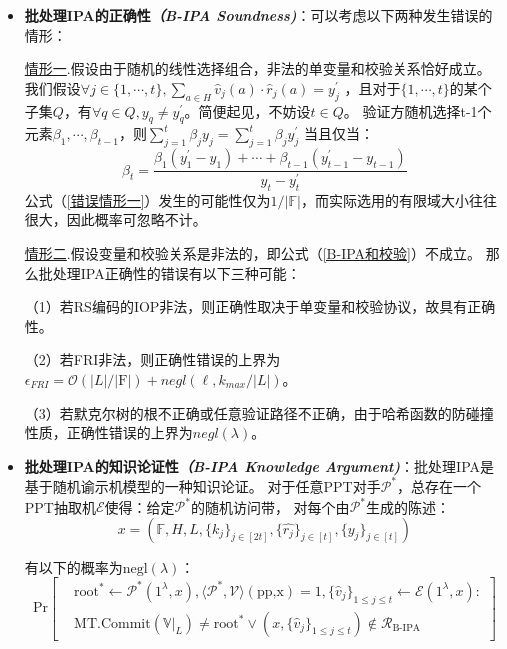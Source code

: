 \documentclass[zihao=-4]{ctexart}
\begin{document}
\begin{spacing}{1.5}
\begin{itemize}
  \item \textbf{批处理IPA的正确性\emph{（B-IPA Soundness)}}：可以考虑以下两种发生错误的情形：\par
        \underline{情形一}.假设由于随机的线性选择组合，非法的单变量和校验关系恰好成立。
        我们假设$\forall j \in\{1,\cdots,t\},\sum_{a\in H}\hat{v}_j(a)\cdot\hat{r}_j(a)=y_j^{\prime}$
        ，且对于$\{1,\cdots,t\}$的某个子集$Q$，有$\forall q \in Q,y_q\neq y_q^{\prime}$。简便起见，不妨设$t\in Q$。
        验证方随机选择t-1个元素$\beta_1,\cdots,\beta_{t-1}$，则$\sum_{j=1}^t\beta_jy_j=\sum_{j=1}^t\beta_jy_j^{\prime}$
        当且仅当：
        \begin{equation}\beta_t=\dfrac{\beta_1(y_1^{\prime}-y_1)+\cdots+\beta_{t-1}(y_{t-1}^{\prime}-y_{t-1})}{y_t-y_t^{\prime}} \label{错误情形一}\end{equation}
        公式（\ref{错误情形一}）发生的可能性仅为$1/|\mathbb{F}|$，而实际选用的有限域大小往往很大，因此概率可忽略不计。\par
        \underline{情形二}.假设变量和校验关系是非法的，即公式（\ref{B-IPA和校验}）不成立。
          那么批处理IPA正确性的错误有以下三种可能：\par
        （1）若RS编码的IOP非法，则正确性取决于单变量和校验协议，故具有正确性。\par
        （2）若FRI非法，则正确性错误的上界为$\epsilon_{FRI}=\mathcal{O}(|L|/|\mathrm{F}|)+negl(\ell,k_{max}/|L|)$。\par
        （3）若默克尔树的根不正确或任意验证路径不正确，由于哈希函数的防碰撞性质，正确性错误的上界为$negl(\lambda)$。
  \item \textbf{批处理IPA的知识论证性\emph{（B-IPA Knowledge Argument)}}：批处理IPA是基于随机谕示机模型的一种知识论证。
        对于任意PPT对手$\mathcal{P}^\ast$，总存在一个PPT抽取机$\mathcal{E}$使得：给定$\mathcal{P}^\ast$的随机访问带，
        对每个由$\mathcal{P}^\ast$生成的陈述：
        \begin{equation}
          x=(\mathbb{F},H,L,\{k_j\}_{j\in [2t]},\{\hat{r_j}\}_{j\in [t]},\{y_j\}_{j \in [t]})
        \end{equation}\par
        有以下的概率为$\text{negl}(\lambda)$：
        \begin{equation}
          \text{Pr}\left[\begin{matrix}&\text{root}^*\leftarrow\mathcal{P}^*(1^{\lambda},x),\langle\mathcal{P}^*,\mathcal{V}\rangle(\text{pp,x})=1,\{\hat{v}_j\}_{1\le j\le t}\leftarrow\mathcal{E}(1^{\lambda},x):\\&\text{MT.Commit}(\mathbb{V}|_L)\neq\text{root}^*\vee(x,\{\hat{v}_j\}_{1\le j\le t})\not\in\mathcal{R}_{\text{B-IPA}}\end{matrix}\right]

\end{equation}
\end{itemize}
\end{spacing}
\end{document}
